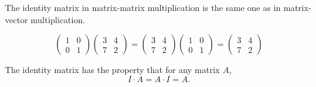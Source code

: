 The identity matrix in matrix-matrix multiplication is the same one as in matrix-vector multiplication.
\begin{example}
  \begin{equation*}
	\begin{pmatrix}
	  1 & 0\\
	  0 & 1
	\end{pmatrix}
	\begin{pmatrix}
	  3 & 4\\
	  7 & 2
	\end{pmatrix}=
	\begin{pmatrix}
	  3 & 4\\
	  7 & 2
	\end{pmatrix}
	\begin{pmatrix}
	  1 & 0\\
	  0 & 1
	\end{pmatrix}=
	\begin{pmatrix}
	  3 & 4\\
	  7 & 2
	\end{pmatrix}
  \end{equation*}
\end{example}

The identity matrix has the property that for any matrix $A$,
\begin{equation*}
  I\cdot A = A\cdot I = A.
\end{equation*}

